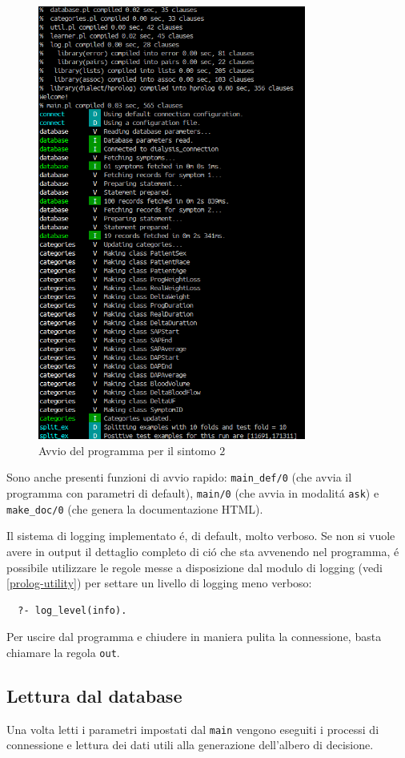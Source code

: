 \documentclass[preprint]{acm_proc_article-sp}
\begin{document}
\begin{figure}[!htb]
\centering
\includegraphics[width=250pt]{figures/prolog-start.png}
\caption{Avvio del programma per il sintomo $2$}
\label{fig:prolog-start}
\end{figure}

Sono anche presenti funzioni di avvio rapido: \verb|main_def/0| (che avvia il programma con parametri di default), \verb|main/0| (che avvia in modalit\'a \verb|ask|) e \verb|make_doc/0| (che genera la documentazione HTML).

Il sistema di logging implementato \'e, di default, molto verboso. Se non si vuole avere in output il dettaglio completo di ci\'o che sta avvenendo nel programma, \'e possibile utilizzare le regole messe a disposizione dal modulo di logging (vedi \ref{prolog-utility}) per settare un livello di logging meno verboso:
\begin{verbatim}
  ?- log_level(info).
\end{verbatim}

Per uscire dal programma e chiudere in maniera pulita la connessione, basta chiamare la regola \verb|out|.

\subsection{Lettura dal database}
\label{prolog-database}
Una volta letti i parametri impostati dal \verb|main| vengono eseguiti i processi di connessione e lettura dei dati utili alla generazione dell'albero di decisione.
\end{document}
